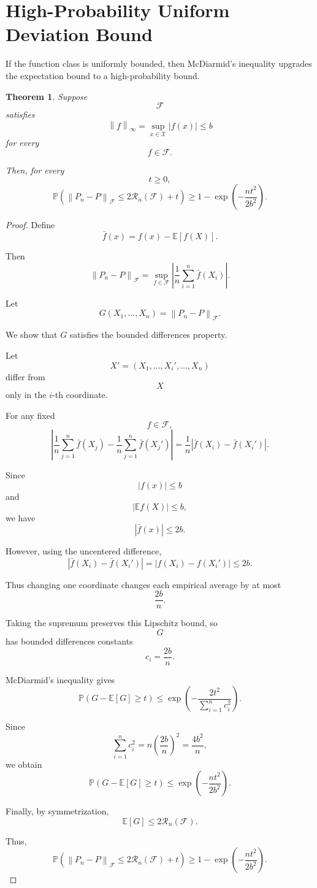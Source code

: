 \documentclass[12pt,oneside]{book}
\numberwithin{equation}{section}
\theoremstyle{definition}
\theoremstyle{plain}
\newtheorem{theorem}{Theorem}[section]
\theoremstyle{remark}
\newcommand{\E}{\mathbb{E}}
\newcommand{\Prob}{\mathbb{P}}
\newcommand{\norm}[1]{\left\lVert #1 \right\rVert}
\begin{document}
\section{High-Probability Uniform Deviation Bound}

If the function class is uniformly bounded, then McDiarmid's inequality upgrades the expectation bound to a high-probability bound.

\begin{theorem}
Suppose
\[
\mathcal{F}
\]
satisfies
\[
\norm{f}_{\infty}
=
\sup_{x\in\mathcal{X}}|f(x)|
\leq b
\]
for every
\[
f\in\mathcal{F}.
\]

Then, for every
\[
t\geq0,
\]
\[
\Prob\left(
\norm{P_n-P}_{\mathcal{F}}
\leq
2\mathcal{R}_n(\mathcal{F})+t
\right)
\geq
1-\exp\left(
-\frac{nt^2}{2b^2}
\right).
\]
\end{theorem}

\begin{proof}
Define
\[
\bar{f}(x)
=
f(x)-\E[f(X)].
\]

Then
\[
\norm{P_n-P}_{\mathcal{F}}
=
\sup_{f\in\mathcal{F}}
\left|
\frac{1}{n}\sum_{i=1}^n \bar{f}(X_i)
\right|.
\]

Let
\[
G(X_1,\dots,X_n)
=
\norm{P_n-P}_{\mathcal{F}}.
\]

We show that $G$ satisfies the bounded differences property.

Let
\[
X'
=
(X_1,\dots,X_i',\dots,X_n)
\]
differ from
\[
X
\]
only in the $i$-th coordinate.

For any fixed
\[
f\in\mathcal{F},
\]
\[
\left|
\frac{1}{n}\sum_{j=1}^n\bar{f}(X_j)
-
\frac{1}{n}\sum_{j=1}^n\bar{f}(X_j')
\right|
=
\frac{1}{n}
|\bar{f}(X_i)-\bar{f}(X_i')|.
\]

Since
\[
|f(x)|\leq b
\]
and
\[
|\E f(X)|\leq b,
\]
we have
\[
|\bar{f}(x)|\leq 2b.
\]

However, using the uncentered difference,
\[
|\bar{f}(X_i)-\bar{f}(X_i')|
=
|f(X_i)-f(X_i')|
\leq
2b.
\]

Thus changing one coordinate changes each empirical average by at most
\[
\frac{2b}{n}.
\]

Taking the supremum preserves this Lipschitz bound, so
\[
G
\]
has bounded differences constants
\[
c_i=\frac{2b}{n}.
\]

McDiarmid's inequality gives
\[
\Prob\left(
G-\E[G]\geq t
\right)
\leq
\exp\left(
-\frac{2t^2}{\sum_{i=1}^n c_i^2}
\right).
\]

Since
\[
\sum_{i=1}^n c_i^2
=
n\left(\frac{2b}{n}\right)^2
=
\frac{4b^2}{n},
\]
we obtain
\[
\Prob\left(
G-\E[G]\geq t
\right)
\leq
\exp\left(
-\frac{nt^2}{2b^2}
\right).
\]

Finally, by symmetrization,
\[
\E[G]
\leq
2\mathcal{R}_n(\mathcal{F}).
\]

Thus,
\[
\Prob\left(
\norm{P_n-P}_{\mathcal{F}}
\leq
2\mathcal{R}_n(\mathcal{F})+t
\right)
\geq
1-\exp\left(
-\frac{nt^2}{2b^2}
\right).
\]
\end{proof}
\end{document}
